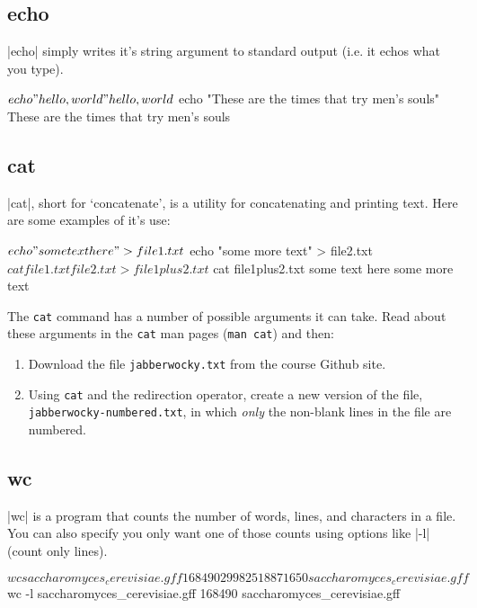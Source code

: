\subsection{echo}

|echo| simply writes it's string argument to standard output (i.e. it echos what you type).
\begin{bash}
$ echo "hello, world"
hello, world
$ echo "These are the times that try men's souls"
These are the times that try men's souls    
\end{bash}


\subsection{cat}

|cat|, short for `concatenate', is a utility for concatenating and printing text. Here are some examples of it's use:
\begin{bash}
$ echo "some text here" > file1.txt
$ echo "some more text" > file2.txt
$ cat file1.txt file2.txt > file1plus2.txt
$ cat file1plus2.txt 
some text here
some more text
\end{bash}


\medskip
\begin{inclassassignment}

The \verb|cat| command has a number of possible arguments it can take. Read about these arguments in the \verb|cat| man pages (\verb|man cat|) and then:
\begin{enumerate}
  \item Download the file \verb|jabberwocky.txt| from the course Github site.
  \item Using \verb|cat| and the redirection operator, create a new version of the file, \verb|jabberwocky-numbered.txt|, in which \emph{only} the non-blank lines in the file are numbered.
\end{enumerate}

\end{inclassassignment}
\medskip

\subsection{wc}

|wc| is a program that counts the number of words, lines, and characters in a file.  You can also specify you only want one of those counts using options like |-l| (count only lines).
\begin{bash}
$ wc saccharomyces_cerevisiae.gff 
  168490  299825 18871650 saccharomyces_cerevisiae.gff
$ wc -l saccharomyces_cerevisiae.gff 
  168490 saccharomyces_cerevisiae.gff    
\end{bash}

